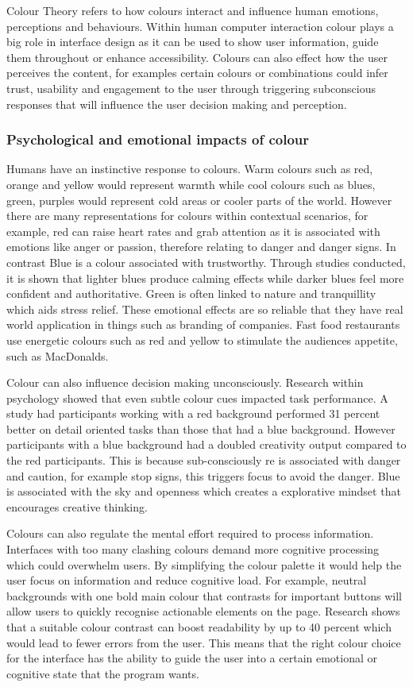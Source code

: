 \documentclass[]{project_final}
\begin{document}
Colour Theory refers to how colours interact and influence human emotions, perceptions and behaviours. Within human computer interaction colour plays a big role in interface design as it can be used to show user information, guide them throughout or enhance accessibility. Colours can also effect how the user perceives the content, for examples certain colours or combinations could infer trust, usability and engagement to the user through triggering subconscious responses that will influence the user decision making and perception.

\subsubsection{Psychological and emotional impacts of colour}

Humans have an instinctive response to colours. Warm colours such as red, orange and yellow would represent warmth while cool colours such as blues, green, purples would represent cold areas or cooler parts of the world. However there are many representations for colours within contextual scenarios, for example, red can raise heart rates and grab attention as it is associated with emotions like anger or passion, therefore relating to danger and danger signs. In contrast Blue is a colour associated with trustworthy. Through studies conducted, it is shown that lighter blues produce calming effects while darker blues feel more confident and authoritative. Green is often linked to nature and tranquillity which aids stress relief. These emotional effects are so reliable that they have real world application in things such as branding of companies. Fast food restaurants use energetic colours such as red and yellow to stimulate the audiences appetite, such as MacDonalds.

Colour can also influence decision making unconsciously. Research within psychology showed that even subtle colour cues impacted task performance. A study had participants working with a red background performed 31 percent better on detail oriented tasks than those that had a blue background. However participants with a blue background had a doubled creativity output compared to the red participants. This is because sub-consciously re is associated with danger and caution, for example stop signs, this triggers focus to avoid the danger. Blue is associated with the sky and openness which creates a explorative mindset that encourages creative thinking.

Colours can also regulate the mental effort required to process information. Interfaces with too many clashing colours demand more cognitive processing which could overwhelm users. By simplifying the colour palette it would help the user focus on information and reduce cognitive load. For example, neutral backgrounds with one bold main colour that contrasts for important buttons will allow users to quickly recognise actionable elements on the page. Research shows that a suitable colour contrast can boost readability by up to 40 percent which would lead to fewer errors from the user. This means that the right colour choice for the interface has the ability to guide the user into a certain emotional or cognitive state that the program wants.
\end{document}
